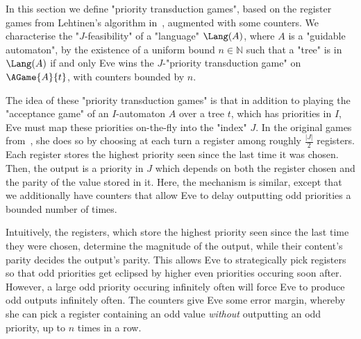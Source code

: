 \documentclass[a4paper,UKenglish,cleveref, autoref, thm-restate]{lipics-v2021}
\newcommand{\NN}{\mathbb{N}}
\newcommand{\A}{{A}}
\begin{document}
In this section we define "priority transduction games", based on the register games from Lehtinen's algorithm  in~\cite{RegisterGames}, augmented with some counters. We characterise the "$J$-feasibility" of a "language" $\Lang(A)$, where $A$ is a "guidable automaton", by the existence of a uniform bound $n\in \NN$ such that a "tree" is in $\Lang(A)$ if and only Eve wins the $J$-"priority transduction game" on $\AGame{A}{t}$, with counters bounded by $n$.

The idea of these "priority transduction games" is that in addition to playing the "acceptance game" of an $I$-automaton $\A$ over a tree $t$, which has priorities in $I$, Eve must map these priorities on-the-fly into the "index" $J$. In the original games from~\cite{RegisterGames}, she does so by choosing at each turn a register among roughly $\frac{\lvert J \rvert }{2}$ registers. Each register stores the highest priority seen since the last time it was chosen. Then, the output is a priority in $J$ which depends on both the register chosen and the parity of the value stored in it. 
Here, the mechanism is similar, except that we additionally have counters that allow Eve to delay outputting odd priorities a bounded number of times.

Intuitively, the registers, which store the highest priority seen since the last time they were chosen, determine the magnitude of the output, while their content's parity decides the output's parity.
This allows Eve to strategically pick registers so that odd priorities get eclipsed by higher even priorities occuring soon after. However, a large odd priority occuring infinitely often will force Eve to produce odd outputs infinitely often.
The counters give Eve some error margin, whereby she can pick a register containing an odd value \textit{without} outputting an odd priority, up to $n$ times in a row. 
\end{document}
